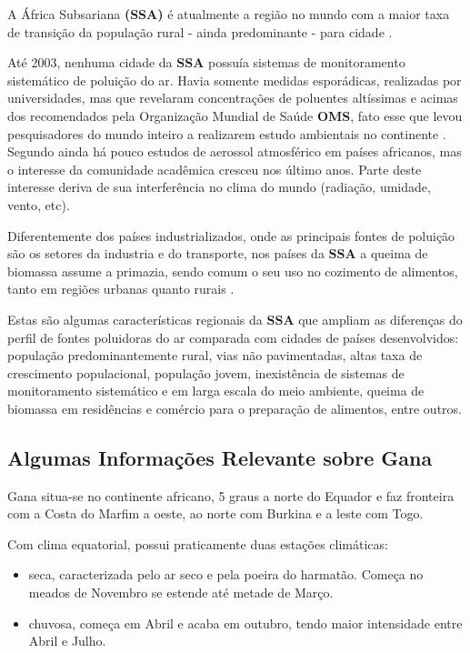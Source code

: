 A África Subsariana \textbf{(SSA)} é atualmente a região no mundo com a maior 
taxa de transição da população rural - ainda predominante - para cidade
\citep{MONTGOMERY2008}. 

Até 2003, nenhuma cidade da \textbf{SSA} possuía sistemas de monitoramento 
sistemático de poluição do ar. Havia somente medidas esporádicas, realizadas
por universidades, mas que revelaram concentrações de poluentes altíssimas e 
acimas dos recomendados pela Organização Mundial de Saúde \textbf{OMS},
fato esse que levou pesquisadores do mundo inteiro a 
realizarem estudo ambientais no continente \citep{EZZATI2004}. 
Segundo \cite{aboh2009} ainda há pouco estudos de aerossol atmosférico 
em países africanos, mas o interesse da comunidade acadêmica cresceu
nos último anos. Parte deste interesse deriva de sua interferência no clima  do mundo
(radiação, umidade, vento, etc).

Diferentemente dos países industrializados, onde as principais fontes de poluição 
são os setores da industria e do transporte, nos países da \textbf{SSA} a 
queima de biomassa assume a primazia, sendo comum o seu uso no cozimento 
de alimentos, tanto em regiões urbanas quanto rurais \citep{SMITH2004}. 

Estas são algumas características regionais da \textbf{SSA} que ampliam as 
diferenças do perfil de fontes poluidoras do ar comparada com cidades 
de países desenvolvidos: população predominantemente rural,
vias não pavimentadas, altas taxa de crescimento populacional, população jovem,
inexistência de sistemas de monitoramento sistemático e em larga escala do meio 
ambiente, queima de biomassa em residências e comércio para o preparação
de alimentos, entre outros. 

\subsection{Algumas Informações Relevante sobre Gana}

Gana situa-se no continente africano, 5 graus a norte do Equador e 
faz fronteira com a Costa do Marfim a oeste, ao norte com Burkina
e a leste com Togo. 

Com clima equatorial, possui praticamente duas estações climáticas:

\begin{itemize}
  \item seca, caracterizada pelo ar seco e pela poeira do harmatão. 
       Começa no meados de Novembro se estende até metade de Março.
 \item chuvosa, começa em Abril e acaba em outubro, tendo maior
       intensidade entre Abril e Julho.
\end{itemize}

